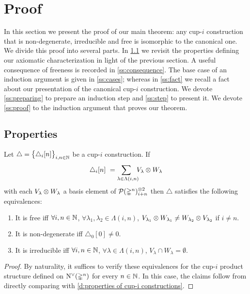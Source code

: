 
\section{Proof} \label{s:proof}

In this section we present the proof of our main theorem: any \mbox{cup-$i$} construction that is non-degenerate, irreducible and free is isomorphic to the canonical one.
We divide this proof into several parts.
In \cref{ss:properties} we revisit the properties defining our axiomatic characterization in light of the previous section.
A useful consequence of freeness is recorded in \cref{ss:consequence}.
The base case of an induction argument is given in \cref{ss:cases}; whereas in
\cref{ss:fact} we recall a fact about our presentation of the canonical cup-$i$ construction.
We devote \cref{ss:preparing} to prepare an induction step and \cref{ss:step} to present it.
We devote \cref{ss:proof} to the induction argument that proves our theorem.

\subsection{Properties} \label{ss:properties}

\begin{lemma} \label{l:properties recasted}
	Let $\triangle = \big\{ \triangle_i [n] \big\}_{i,n\in\mathbb{N}}$ be a \mbox{cup-$i$} construction.
	If
	\[
	\triangle_i [n] \ =
	\sum_{\lambda \in \Lambda(i,n) \kern-5pt} V_\lambda \otimes W_\lambda
	\]
	with each $V_\lambda \otimes W_\lambda$ a basis element of $\mathcal{P}(\mathbb{\Delta}^n)^{\otimes 2}_{i+n}$ then $\triangle$ satisfies the following equivalences:
	\begin{enumerate}
		\item It is free iff \kern 1pt
		$\forall i,n \in \mathbb{N}$, $\forall \lambda_1, \lambda_2 \in \Lambda(i,n)$, $V_{\lambda_1} \otimes W_{\lambda_1} \neq W_{\lambda_2} \otimes V_{\lambda_2}$ if $i \neq n$.
		\item It is non-degenerate iff
		$\triangle_0 [0] \neq 0$.
		\item It is irreducible iff \kern 1pt
		$\forall i,n \in \mathbb{N}$, $\forall \lambda \in \Lambda(i,n)$, $V_\lambda \cap W_\lambda = \emptyset$.
	\end{enumerate}
\end{lemma}

\begin{proof}
	By naturality, it suffices to verify these equivalences for the \mbox{cup-$i$} product structure defined on $\operatorname{N^{\vee}}(\mathbb{\Delta}^n)$ for every $n \in \mathbb{N}$.
	In this case, the claims follow from directly comparing with \cref{d:properties of cup-i constructions}.
\end{proof}


